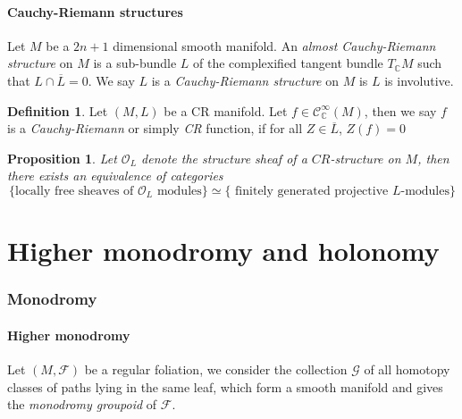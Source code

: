 \documentclass[12pt]{amsart}
\newtheorem{prop}[thm]{Proposition}
\theoremstyle{definition}
\newtheorem{defn}[thm]{Definition}
\theoremstyle{remark}
\numberwithin{equation}{section}
\newcommand{\CG}{{\mathcal G}}
\newcommand{\CF}{{\mathcal F}}
\newcommand{\CO}{{\mathcal O}}
\newcommand{\cinf}{{\mathcal C}^{\infty}}
\newcommand{\C}{{\mathbb{C}}}
\newcommand{\1}{{\mathbb{1}}}
\begin{document}
\subsection{Cauchy-Riemann structures}
Let $M$ be a $2n + 1$ dimensional smooth manifold. An {\it almost Cauchy-Riemann structure} on $M$ is a sub-bundle $L$ of the complexified tangent bundle $T_{\C} M$ such that $L \cap \overline{L} = 0$. We say $L$ is a {\it Cauchy-Riemann structure} on $M$ is $L$ is involutive.

\begin{defn}
    Let $(M, L)$ be a CR manifold. Let $f\in \cinf_{\C}(M)$, then we say $f$ is a {\it Cauchy-Riemann} or simply {\it CR} function, if for all $Z \in \overline{L}$, $Z(f) = 0$
\end{defn}

\begin{prop}
Let $\CO_L$ denote the structure sheaf of a $CR$-structure on $M$, then there exists an equivalence of categories
\begin{equation}
    \{\text{locally free sheaves of $\CO_L$ modules}\} \simeq \{\text{ finitely generated projective $L$-modules} \}
\end{equation}
\end{prop}








\part{Higher monodromy and holonomy}



\section{Monodromy}
\subsection{Higher monodromy}
Let $(M, \CF)$ be a regular foliation, we consider the collection $\CG$ of all homotopy classes of paths lying in the same leaf, which form a smooth manifold and gives the {\it monodromy groupoid} of $\CF$. 
\end{document}
